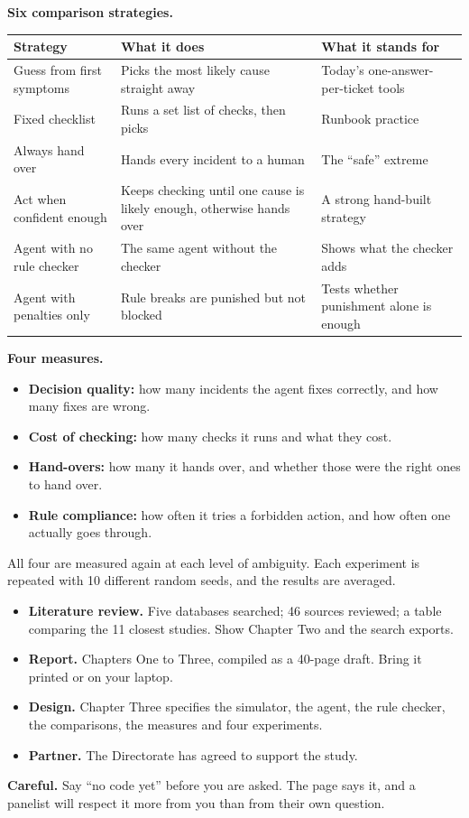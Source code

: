 \documentclass[10pt,a4paper]{article}
\newcommand{\sub}[1]{\par\vspace{4pt}{\bfseries\fontsize{10.6}{13}\selectfont #1}\par}
\newcommand{\caution}[1]{\par\colorbox{warnsoft}{\parbox{\dimexpr\linewidth-2\fboxsep}{\textbf{\color{warn}Careful.} #1}}\par}
\begin{document}
\textbf{Six comparison strategies.}

\begin{tabularx}{\linewidth}{@{}p{4.3cm}LL@{}}
\toprule
\textbf{Strategy} & \textbf{What it does} & \textbf{What it stands for} \\
\midrule
Guess from first symptoms & Picks the most likely cause straight away & Today's one-answer-per-ticket tools \\
Fixed checklist & Runs a set list of checks, then picks & Runbook practice \\
Always hand over & Hands every incident to a human & The ``safe'' extreme \\
Act when confident enough & Keeps checking until one cause is likely enough, otherwise hands over & A strong hand-built strategy \\
Agent with no rule checker & The same agent without the checker & Shows what the checker adds \\
Agent with penalties only & Rule breaks are punished but not blocked & Tests whether punishment alone is enough \\
\bottomrule
\end{tabularx}

\textbf{Four measures.}
\begin{itemize}
  \item \textbf{Decision quality:} how many incidents the agent fixes correctly, and how many fixes are wrong.
  \item \textbf{Cost of checking:} how many checks it runs and what they cost.
  \item \textbf{Hand-overs:} how many it hands over, and whether those were the right ones to hand over.
  \item \textbf{Rule compliance:} how often it tries a forbidden action, and how often one actually goes through.
\end{itemize}
All four are measured again at each level of ambiguity. Each experiment is repeated with 10 different random seeds, and the results are averaged.

\sub{4.6 Progress: what you can show}
\begin{itemize}
  \item \textbf{Literature review.} Five databases searched; 46 sources reviewed; a table comparing the 11 closest studies. Show Chapter Two and the search exports.
  \item \textbf{Report.} Chapters One to Three, compiled as a 40-page draft. Bring it printed or on your laptop.
  \item \textbf{Design.} Chapter Three specifies the simulator, the agent, the rule checker, the comparisons, the measures and four experiments.
  \item \textbf{Partner.} The Directorate has agreed to support the study.
\end{itemize}
\caution{Say ``no code yet'' before you are asked. The page says it, and a panelist will respect it more from you than from their own question.}
\end{document}
